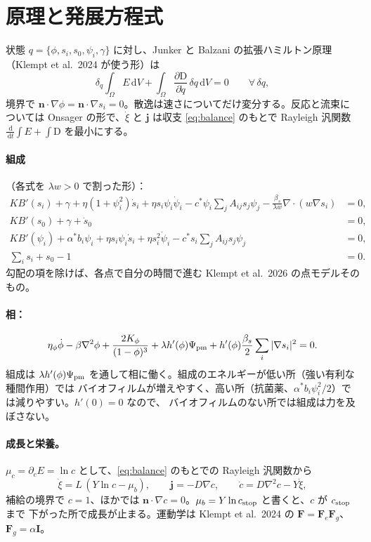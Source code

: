 \documentclass[11pt,a4paper]{article}
\theoremstyle{definition}
\newcommand{\dd}{\,\mathrm{d}}
\newcommand{\D}{\mathrm{D}}
\begin{document}
\section{原理と発展方程式}

状態 $q=\{\phi,s_i,s_0,\psi_i,\gamma\}$ に対し、Junker と Balzani の拡張ハミルトン原理（Klempt et al.\ 2024 が使う形）は
\begin{equation}
\delta_q\int_\Omega E\dd V+\int_\Omega\frac{\partial\D}{\partial\dot q}\,\delta q\dd V=0
\qquad\forall\,\delta q,
\label{eq:principle}
\end{equation}
境界で $\mathbf n\cdot\nabla\phi=\mathbf n\cdot\nabla s_i=0$。散逸は速さについてだけ変分する。反応と流束については
Onsager の形で、$\dot\xi$ と $\mathbf j$ は収支 \eqref{eq:balance} のもとで Rayleigh 汎関数
$\frac{\dd}{\dd t}\int E+\int\D$ を最小にする。

\paragraph{組成}（各式を $\lambda w>0$ で割った形）：
\begin{align}
KB'(s_i)+\gamma+\eta(1+\psi_i^2)\dot s_i+\eta s_i\psi_i\dot\psi_i-c^*\psi_i\sum_jA_{ij}s_j\psi_j
-\frac{\beta_s}{\lambda w}\nabla\!\cdot(w\nabla s_i)&=0,\label{eq:s}\\
KB'(s_0)+\gamma+\dot s_0&=0,\\
KB'(\psi_i)+\alpha^*b_i\psi_i+\eta s_i\psi_i\dot s_i+\eta s_i^2\dot\psi_i-c^*s_i\sum_jA_{ij}s_j\psi_j&=0,\label{eq:psi}\\
\textstyle\sum_is_i+s_0-1&=0 .
\end{align}
勾配の項を除けば、各点で自分の時間で進む Klempt et al.\ 2026 の点モデルそのもの。

\paragraph{相：}
\begin{equation}
\eta_\phi\dot\phi-\beta\nabla^2\phi+\frac{2K_\phi}{(1-\phi)^3}
+\lambda h'(\phi)\Psi_{\rm pm}+h'(\phi)\frac{\beta_s}{2}\sum_i|\nabla s_i|^2=0 .
\label{eq:phi}
\end{equation}
組成は $\lambda h'(\phi)\Psi_{\rm pm}$ を通して相に働く。組成のエネルギーが低い所（強い有利な種間作用）では
バイオフィルムが増えやすく、高い所（抗菌薬、$\alpha^*b_i\psi_i^2/2$）では減りやすい。$h'(0)=0$ なので、
バイオフィルムのない所では組成は力を及ぼさない。

\paragraph{成長と栄養。} $\mu_c=\partial_cE=\ln c$ として、\eqref{eq:balance} のもとでの Rayleigh 汎関数から
\begin{equation}
\dot\xi=L\,(Y\ln c-\mu_b),\qquad \mathbf j=-D\nabla c,\qquad
\dot c=D\nabla^2c-Y\dot\xi ,
\label{eq:growth}
\end{equation}
補給の境界で $c=1$、ほかでは $\mathbf n\cdot\nabla c=0$。$\mu_b=Y\ln c_{\rm stop}$ と書くと、$c$ が $c_{\rm stop}$ まで
下がった所で成長が止まる。運動学は Klempt et al.\ 2024 の $\mathbf F=\mathbf F_e\mathbf F_g$、$\mathbf F_g=\alpha\mathbf I$。
\end{document}

